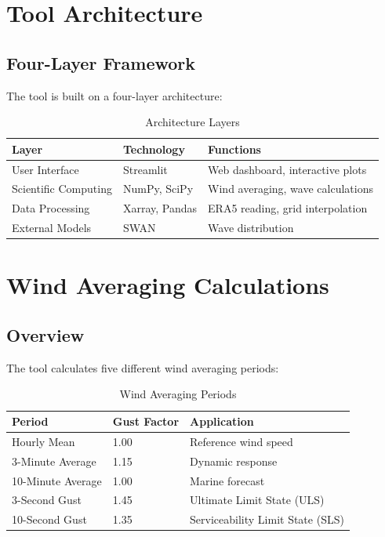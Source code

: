 \documentclass[12pt]{article}
\begin{document}
\newpage

\section{Tool Architecture}

\subsection{Four-Layer Framework}

The tool is built on a four-layer architecture:

\begin{table}[h]
\centering
\begin{tabular}{|p{3cm}|p{4cm}|p{6cm}|}
\hline
\textbf{Layer} & \textbf{Technology} & \textbf{Functions} \\
\hline
User Interface & Streamlit & Web dashboard, interactive plots \\
Scientific Computing & NumPy, SciPy & Wind averaging, wave calculations \\
Data Processing & Xarray, Pandas & ERA5 reading, grid interpolation \\
External Models & SWAN & Wave distribution \\
\hline
\end{tabular}
\caption{Architecture Layers}
\end{table}

\newpage

\section{Wind Averaging Calculations}

\subsection{Overview}

The tool calculates five different wind averaging periods:

\begin{table}[h]
\centering
\begin{tabular}{|l|l|l|}
\hline
\textbf{Period} & \textbf{Gust Factor} & \textbf{Application} \\
\hline
Hourly Mean & 1.00 & Reference wind speed \\
3-Minute Average & 1.15 & Dynamic response \\
10-Minute Average & 1.00 & Marine forecast \\
3-Second Gust & 1.45 & Ultimate Limit State (ULS) \\
10-Second Gust & 1.35 & Serviceability Limit State (SLS) \\
\hline
\end{tabular}
\caption{Wind Averaging Periods}
\end{table}
\end{document}
